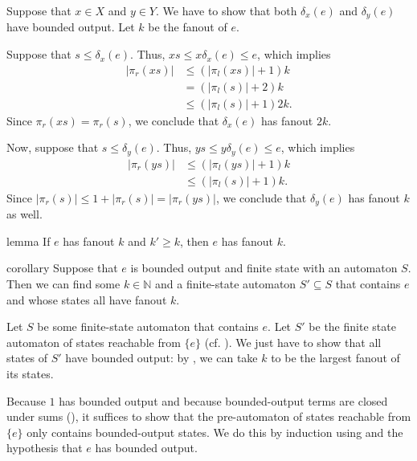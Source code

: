 \documentclass[a4paper,UKenglish,cleveref, autoref, thm-restate]{lipics-v2021}
\begin{document}
\begin{proofEnd}
  Suppose that $x  \in  X$ and $y  \in  Y$. We have to show that both $ \delta _x(e)$ and
  $ \delta _y(e)$ have bounded output.  Let $k$ be the fanout of $e$.

  Suppose that $s  \leq   \delta _x(e)$.  Thus, $xs  \leq  x \delta _x(e)  \leq  e$, which implies
  \begin{align*}
    | \pi _r(xs)|
    &  \leq  (| \pi _l(xs)|+1)k \\
    & = (| \pi _l(s)|+2)k \\
    &  \leq  (| \pi _l(s)|+1)2k.
  \end{align*}
  Since $ \pi _r(xs) =  \pi _r(s)$, we conclude that $ \delta _x(e)$ has fanout $2k$.

  Now, suppose that $s  \leq   \delta _y(e)$.  Thus, $ys  \leq  y \delta _y(e)  \leq  e$, which implies
  \begin{align*}
    | \pi _r(ys)|
    &  \leq  (| \pi _l(ys)|+1)k \\
    &  \leq  (| \pi _l(s)|+1)k.
  \end{align*}
  Since $| \pi _r(s)|  \leq  1 + | \pi _r(s)| = | \pi _r(ys)|$, we conclude that $ \delta _y(e)$ has
  fanout $k$ as well.
\end{proofEnd}

\begin{theoremEnd}{lemma}
  \label{lem:fanout-monotonicity}
  If $e$ has fanout $k$ and $k'  \geq  k$, then $e$ has fanout $k$.
\end{theoremEnd}

\begin{theoremEnd}{corollary}
  \label{cor:bounded-output-finite-state}
  Suppose that $e$ is bounded output and finite state with an automaton $S$.
  Then we can find some $k  \in  \mathbb{N}$ and a finite-state automaton $S'  \subseteq  S$ that
  contains $e$ and whose states all have fanout $k$.
\end{theoremEnd}

\begin{proofEnd}
  Let $S$ be some finite-state automaton that contains $e$.  Let $S'$ be the
  finite state automaton of states reachable from $\{e\}$
  (cf. ).  We just have to show that all
  states of $S'$ have bounded output: by , we can
  take $k$ to be the largest fanout of its states.

  Because $1$ has bounded output and because bounded-output terms are closed
  under sums (), it suffices to show that the
  pre-automaton of states reachable from $\{e\}$ only contains bounded-output
  states.  We do this by induction using 
  and the hypothesis that $e$ has bounded output.
\end{proofEnd}
\end{document}
